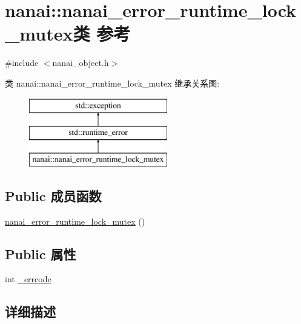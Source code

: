 \hypertarget{classnanai_1_1nanai__error__runtime__lock__mutex}{}\section{nanai\+:\+:nanai\+\_\+error\+\_\+runtime\+\_\+lock\+\_\+mutex类 参考}
\label{classnanai_1_1nanai__error__runtime__lock__mutex}


{\ttfamily \#include $<$nanai\+\_\+object.\+h$>$}

类 nanai\+:\+:nanai\+\_\+error\+\_\+runtime\+\_\+lock\+\_\+mutex 继承关系图\+:\begin{figure}[H]
\begin{center}
\leavevmode
\includegraphics[height=3.000000cm]{classnanai_1_1nanai__error__runtime__lock__mutex}
\end{center}
\end{figure}
\subsection*{Public 成员函数}
\begin{DoxyCompactItemize}
\item 
\hyperlink{classnanai_1_1nanai__error__runtime__lock__mutex_ab4db66d8a33d10c1cfffc880adba1d2f}{nanai\+\_\+error\+\_\+runtime\+\_\+lock\+\_\+mutex} ()
\end{DoxyCompactItemize}
\subsection*{Public 属性}
\begin{DoxyCompactItemize}
\item 
int \hyperlink{classnanai_1_1nanai__error__runtime__lock__mutex_ab01eae05d07fbef9dc8badb4d9aa1b05}{\+\_\+errcode}
\end{DoxyCompactItemize}


\subsection{详细描述}


